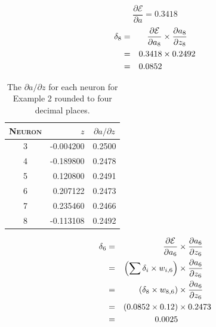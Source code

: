 \documentclass[xcolor={table}]{beamer}
\newcommand{\featN}[1]{\textsc{#1}}
\begin{document}
 \begin{frame} 
\begin{equation}
\frac{\partial \mathcal{E}}{\partial a}=0.3418
\end{equation}
\begin{alignat}{3}
\delta_8 & = & \frac{\partial \mathcal{E}}{\partial a_8} &\times \frac{\partial a_8}{\partial z_8} \notag\\
& = & 0.3418 &\times 0.2492 \notag\\
& = & 0.0852
\label{eq:delta8calc}
\end{alignat}
\end{frame} 



 \begin{frame} 
\begin{table}[htb]
\caption {The $\partial a/\partial z$ for each neuron for Example 2 rounded to four decimal places.}
\label{tab:activationfunctionderivatives}
\begin{tabular}{crc}
\hline
\featN{Neuron} & $z$ & $\partial a/\partial z$\\
\hline
3 & -0.004200& 0.2500\\
4 & -0.189800& 0.2478\\
5 & 0.120800& 0.2491\\
6 & 0.207122& 0.2473\\
7 & 0.235460& 0.2466\\
8 & -0.113108& 0.2492\\
\hline
\end{tabular}
\end{table}
\end{frame} 



 \begin{frame} 
\begin{alignat}{3}
\delta_6 & = & \frac{\partial \mathcal{E}}{\partial a_6} &\times \frac{\partial a_6}{\partial z_6} \notag\\
& = & \left(\sum \delta_i \times w_{i,6}\right) &\times \frac{\partial a_6}{\partial z_6} \notag\\
& = & \left(\delta_8 \times w_{8,6}\right) &\times \frac{\partial a_6}{\partial z_6} \notag\\
& = & \left(0.0852 \times 0.12\right) &\times 0.2473\notag\\
& = & 0.0025
\label{eq:delta6}
\end{alignat}
\end{frame} 
\end{document}
